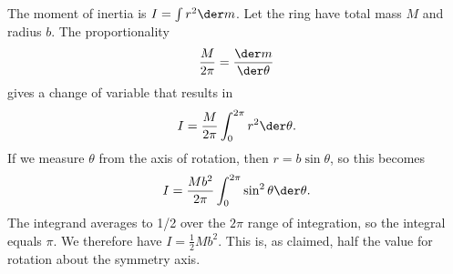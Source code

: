 The moment of inertia is $I=\int r^2\der m$.
Let the ring have total mass $M$ and radius $b$.
The proportionality
\begin{equation*}
  \frac{M}{2\pi} = \frac{\der m}{\der\theta}
\end{equation*}
gives a change of variable that results in
\begin{equation*}
  I = \frac{M}{2\pi}\int_0^{2\pi} r^2\der\theta .
\end{equation*}
If we measure $\theta$ from the axis of rotation, then
$r=b\sin\theta$, so this becomes
\begin{equation*}
  I = \frac{Mb^2}{2\pi}\int_0^{2\pi} \sin^2\theta \der\theta .
\end{equation*}
The integrand averages to 1/2 over the $2\pi$ range of integration,
so the integral equals $\pi$. We therefore have
$I=\frac{1}{2}Mb^2$. This is, as claimed, half the value for rotation
about the symmetry axis.
